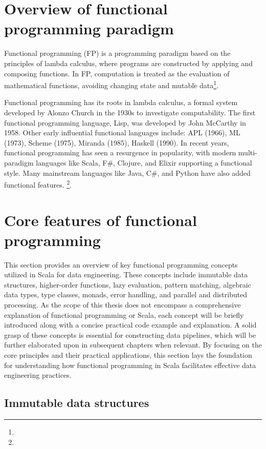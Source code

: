 \section{Overview of functional programming paradigm}

Functional programming (FP) is a programming paradigm based on the principles of lambda calculus, where programs are constructed by applying and composing functions.  In FP, computation is treated as the evaluation of mathematical functions, avoiding changing state and mutable data\footnote[5]{}.

Functional programming has its roots in lambda calculus, a formal system developed by Alonzo Church in the 1930s to investigate computability. The first functional programming language, Lisp, was developed by John McCarthy in 1958. Other early influential functional languages include: APL (1966), ML (1973), Scheme (1975), Miranda (1985), Haskell (1990). In recent years, functional programming has seen a resurgence in popularity, with modern multi-paradigm languages like Scala, F\#, Clojure, and Elixir supporting a functional style. Many mainstream languages like Java, C\#, and Python have also added functional features. \footnote[6]{}.

\section{Core features of functional programming}

This section provides an overview of key functional programming concepts utilized in Scala for data engineering. These concepts include immutable data structures, higher-order functions, lazy evaluation, pattern matching, algebraic data types, type classes, monads, error handling, and parallel and distributed processing. As the scope of this thesis does not encompass a comprehensive explanation of functional programming or Scala, each concept will be briefly introduced along with a concise practical code example and explanation. A solid grasp of these concepts is essential for constructing data pipelines, which will be further elaborated upon in subsequent chapters when relevant. By focusing on the core principles and their practical applications, this section lays the foundation for understanding how functional programming in Scala facilitates effective data engineering practices.

\subsection{Immutable data structures}

